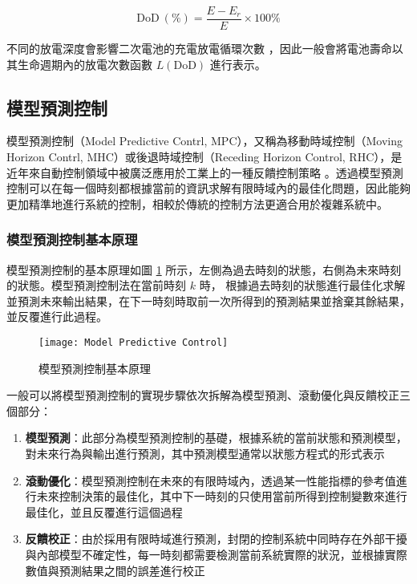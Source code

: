 \begin{equation}\label{equation: Depth of Discharge}
  \text{DoD}~(\%) = \frac{E - E_{r}}{E} \times 100 \%
\end{equation}

不同的放電深度會影響二次電池的充電放電循環次數 \cite{dogger2010characterization}，因此一般會將電池壽命以其生命週期內的放電次數函數 $L(\text{DoD})$ 進行表示。 

\subsection{模型預測控制}

模型預測控制（Model Predictive Contrl, MPC），又稱為移動時域控制（Moving Horizon Contrl, MHC）或後退時域控制（Receding Horizon Control, RHC），是近年來自動控制領域中被廣泛應用於工業上的一種反饋控制策略 \cite{richalet1978model}。透過模型預測控制可以在每一個時刻都根據當前的資訊求解有限時域內的最佳化問題，因此能夠更加精準地進行系統的控制，相較於傳統的控制方法更適合用於複雜系統中。

\subsubsection{模型預測控制基本原理}

模型預測控制的基本原理如圖 \ref{figure: Model Predictive Contrl} 所示，左側為過去時刻的狀態，右側為未來時刻的狀態。模型預測控制法在當前時刻 $k$ 時， 根據過去時刻的狀態進行最佳化求解並預測未來輸出結果，在下一時刻時取前一次所得到的預測結果並捨棄其餘結果，並反覆進行此過程。

\begin{figure}[htbp]
  \centering
  \texttt{[image: Model Predictive Control]}
  \caption{模型預測控制基本原理}
  \label{figure: Model Predictive Contrl}
\end{figure}

一般可以將模型預測控制的實現步驟依次拆解為模型預測、滾動優化與反饋校正三個部分：

\begin{enumerate}
  \item \textbf{模型預測}：此部分為模型預測控制的基礎，根據系統的當前狀態和預測模型，對未來行為與輸出進行預測，其中預測模型通常以狀態方程式的形式表示
  \item \textbf{滾動優化}：模型預測控制在未來的有限時域內，透過某一性能指標的參考值進行未來控制決策的最佳化，其中下一時刻的只使用當前所得到控制變數來進行最佳化，並且反覆進行這個過程
  \item \textbf{反饋校正}：由於採用有限時域進行預測，封閉的控制系統中同時存在外部干擾與內部模型不確定性，每一時刻都需要檢測當前系統實際的狀況，並根據實際數值與預測結果之間的誤差進行校正
\end{enumerate}

